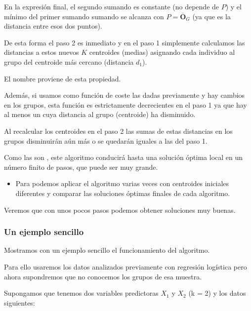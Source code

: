 En la expresión final, el segundo sumando es constante (no depende de $P$) y el mínimo del primer sumando sumando se alcanza con $P=\overline{\mathbf{O}}_G$ (ya que es la distancia entre esos dos puntos).

De esta forma el paso 2 es inmediato y en el paso 1 simplemente calculamos las distancias a estos nuevos $K$ centroides (medias) asignando cada individuo al grupo del centroide más cercano (distancia $d_1$).

El nombre  proviene de esta propiedad.

Además, si usamos como función de coste las dadas previamente y hay cambios en los grupos, esta función es estrictamente decrecientes en el paso 1 ya que hay al menos un  cuya distancia al grupo (centroide) ha disminuido.

Al recalcular los centroides en el paso 2 las sumas de estas distancias en los grupos disminuirán aún más o se quedarán iguales a las del paso 1.

Como las  son , este algoritmo conducirá hasta una solución óptima local en un número finito de pasos, que puede ser muy grande.
\begin{itemize}
\item Para  podemos aplicar el algoritmo varias veces con centroides iniciales diferentes y comparar las soluciones óptimas finales de cada algoritmo.
\end{itemize}
Veremos que con unos pocos pasos podemos obtener soluciones muy buenas.
\subsubsection{Un ejemplo sencillo}
Mostramos con un ejemplo sencillo el funcionamiento del algoritmo.

Para ello usaremos los datos analizados previamente con regresión logística pero ahora supondremos que no conocemos los grupos de esa muestra.

Supongamos que tenemos dos variables predictoras $X_1$ y $X_2$ (k = 2) y los datos siguientes:

